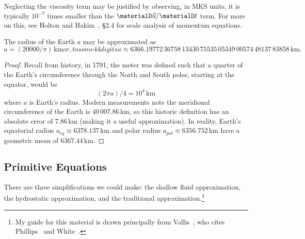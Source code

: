 Neglecting the viscosity term may be justified by observing, in MKS
units, it is typically $10^{-7}$ times smaller than the $\materialD\vec{u}/\materialD t$
term. For more on this, see Holton and
Hakim~\cite{holton2013dynamicMeteorology}, \S2.4 for scale analysis of
momentum equations.

\begin{prop}
  The radius of the Earth $a$ may be approximated as
  \begin{subequations}
    \begin{equation}
      a = (20000/\pi)\,\mathrm{km}
  \end{equation}
  or, to some 44 digits
  \begin{equation}
    a\approx
    6366.19772\,36758\,13430\,75535\,05349\,00574\,48137\,83858%
    \,\mathrm{km}.
  \end{equation}
  \end{subequations}
\end{prop}
\begin{proof}
  Recall from history, in 1791, the meter was defined such that a
  quarter of the Earth's circumference through the North and South
  poles, starting at the equator, would be
\begin{equation}
  (2\pi a)/4 = 10^{4}\,\mathrm{km}
\end{equation}
where $a$ is Earth's radius. Modern measurements note the meridional
circumference of the Earth is $40\,007.86\,\mathrm{km}$, so this
historic definition has an absolute error of $7.86\,\mathrm{km}$ (making
it a useful approximation). In reality, Earth's equatorial
radius $a_{eq}\approx 6378.137\,\mathrm{km}$ and polar radius
$a_{pol}\approx6356.752\,\mathrm{km}$ have a geometric mean of
$6367.44\,\mathrm{km}$.
\end{proof}

\subsection{Primitive Equations}

There are three simplifications we could make: the shallow fluid
approximation, the hydrostatic approximation, and the traditional
approximation.\footnote{My guide for this material is drawn
principally from Vallis~\cite[\S\S2.2.4--2.2.5]{vallis_2017}, who cites
Phillips~\cite{phillips1966TheEquationsofMotionforaShallowRotatingAtmosphereandtheTraditionalApproximation}
and White~\cite{white2002}.}

